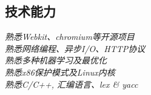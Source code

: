 \documentclass[margin, 10pt]{res} %
\begin{document}
\begin{resume}

\section{技术能力} 
{\sl 熟悉Webkit、chromium等开源项目} \\
{\sl 熟悉网络编程、异步I/O、HTTP协议} \\
{\sl 熟悉多种机器学习及最优化} \\
{\sl 熟悉x86保护模式及Linux内核} \\
{\sl 熟悉C/C++, 汇编语言、lex \& yacc} \\

\end{resume}
\end{document}
